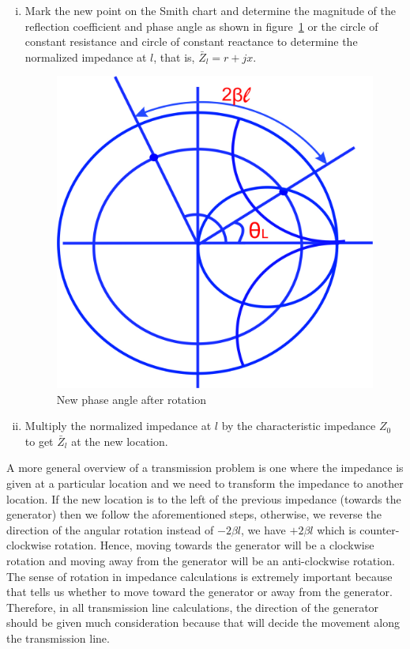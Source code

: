 \begin{enumerate}[(i)]
\item Mark the new point on the Smith chart and determine the magnitude of the reflection coefficient and phase angle as shown in figure~\ref{fig:uyhbgjvkclxse} or the circle of constant resistance and circle of constant reactance to determine the normalized impedance at $l$, that is, $\bar{Z}_{l} = r + jx$.
\begin{figure}[h]
\centering
\includegraphics[width=0.7\linewidth]{graphics/uyhbgjvkclxse}
\caption{New phase angle after rotation}
\label{fig:uyhbgjvkclxse}
\end{figure}

\item Multiply the normalized impedance at $l$ by the characteristic impedance $Z_0$ to get $\bar{Z}_{l}$ at the new location.
\end{enumerate}

A more general overview of a transmission problem is one where the impedance is given at a particular location and we need to transform the impedance to another location. If the new location is to the left of the previous impedance (towards the generator) then we follow the aforementioned steps, otherwise, we reverse the direction of the angular rotation instead of $-2\beta{l}$, we have $+2\beta{l}$ which is counter-clockwise rotation. Hence, moving towards the generator will be a clockwise rotation and moving away from the generator will be an anti-clockwise rotation. The sense of rotation in impedance calculations is extremely important because that tells us whether to move toward the generator or away from the generator. Therefore, in all transmission line calculations, the direction of the generator should be given much consideration because that will decide the movement along the transmission line.

